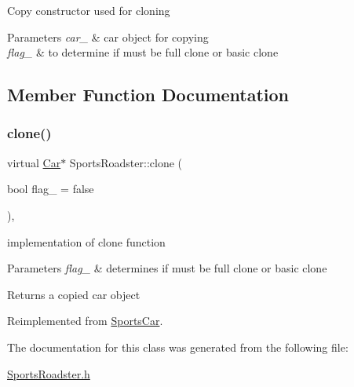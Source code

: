 Copy constructor used for cloning 
\begin{DoxyParams}{Parameters}
{\em car\+\_\+} & car object for copying \\
\hline
{\em flag\+\_\+} & to determine if must be full clone or basic clone \\
\hline
\end{DoxyParams}


\subsection{Member Function Documentation}
\mbox{\label{class_sports_roadster_a2f6df8bfdb8a28c413dbd976de77f68a}} 
\subsubsection{\texorpdfstring{clone()}{clone()}}
{\footnotesize\ttfamily virtual \mbox{\hyperlink{class_car}{Car}}$\ast$ Sports\+Roadster\+::clone (\begin{DoxyParamCaption}\item[{bool}]{flag\+\_\+ = {\ttfamily false} }\end{DoxyParamCaption})\hspace{0.3cm}{\ttfamily [inline]}, {\ttfamily [virtual]}}

implementation of clone function 
\begin{DoxyParams}{Parameters}
{\em flag\+\_\+} & determines if must be full clone or basic clone \\
\hline
\end{DoxyParams}
\begin{DoxyReturn}{Returns}
a copied car object 
\end{DoxyReturn}


Reimplemented from \mbox{\hyperlink{class_sports_car_a4daa739baaee9d9d5ad33f4766ec43ec}{Sports\+Car}}.



The documentation for this class was generated from the following file\+:\begin{DoxyCompactItemize}
\item 
\mbox{\hyperlink{_sports_roadster_8h}{Sports\+Roadster.\+h}}\end{DoxyCompactItemize}
